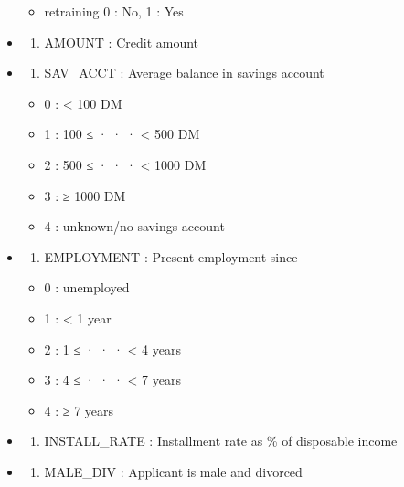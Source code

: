 \documentclass[
]{article}
\providecommand{\tightlist}{%
  \setlength{\itemsep}{0pt}\setlength{\parskip}{0pt}}
\begin{document}
\begin{itemize}
  \begin{itemize}
  \tightlist
  \item
    retraining 0 : No, 1 : Yes
  \end{itemize}
\item
  \begin{enumerate}
  \def\labelenumi{\arabic{enumi})}
  \setcounter{enumi}{10}
  \tightlist
  \item
    AMOUNT : Credit amount
  \end{enumerate}
\item
  \begin{enumerate}
  \def\labelenumi{\arabic{enumi})}
  \setcounter{enumi}{11}
  \tightlist
  \item
    SAV\_ACCT : Average balance in savings account
  \end{enumerate}

  \begin{itemize}
  \tightlist
  \item
    0 : \textless{} 100 DM
  \item
    1 : 100 ≤ · · · \textless{} 500 DM
  \item
    2 : 500 ≤ · · · \textless{} 1000 DM
  \item
    3 : ≥ 1000 DM
  \item
    4 : unknown/no savings account
  \end{itemize}
\item
  \begin{enumerate}
  \def\labelenumi{\arabic{enumi})}
  \setcounter{enumi}{12}
  \tightlist
  \item
    EMPLOYMENT : Present employment since
  \end{enumerate}

  \begin{itemize}
  \tightlist
  \item
    0 : unemployed
  \item
    1 : \textless{} 1 year
  \item
    2 : 1 ≤ · · · \textless{} 4 years
  \item
    3 : 4 ≤ · · · \textless{} 7 years
  \item
    4 : ≥ 7 years
  \end{itemize}
\item
  \begin{enumerate}
  \def\labelenumi{\arabic{enumi})}
  \setcounter{enumi}{13}
  \tightlist
  \item
    INSTALL\_RATE : Installment rate as \% of disposable income
  \end{enumerate}
\item
  \begin{enumerate}
  \def\labelenumi{\arabic{enumi})}
  \setcounter{enumi}{14}
  \tightlist
  \item
    MALE\_DIV : Applicant is male and divorced
  \end{enumerate}


\end{itemize}
\end{document}
